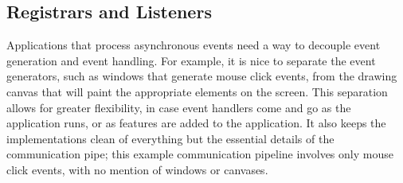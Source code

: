 %
%
%
%
%
%

\subsection{Registrars and Listeners}

Applications that process asynchronous events need a way to decouple event
generation and event handling. For example, it is nice to separate the event
generators, such as windows that generate mouse click events, from the drawing
canvas that will paint the appropriate elements on the screen. This separation
allows for greater flexibility, in case event handlers come and go as the
application runs, or as features are added to the application. It also keeps the
implementations clean of everything but the essential details of the
communication pipe; this example communication pipeline involves only mouse
click events, with no mention of windows or canvases.

